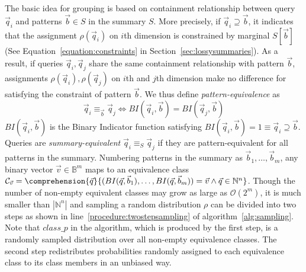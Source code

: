 The basic idea for grouping is based on containment relationship between query $\vec q_i$ and patterns $\vec{b}\in S$ in the summary $S$. 
More precisely, if $\vec{q}_i\supseteq\vec{b}$, it indicates that the assignment $\rho(\vec{q}_i)$ on $i$th dimension is constrained by marginal $S[\vec{b}]$ (See Equation~\ref{equation:constraints} in Section~\ref{sec:lossysummaries}).
As a result, if queries $\vec{q}_i,\vec{q}_j$ share the same containment relationship with pattern $\vec{b}$, assignments $\rho(\vec{q}_i),\rho(\vec{q}_j)$ on $i$th and $j$th dimension make no difference for satisfying the constraint of pattern $\vec{b}$.
We thus define \textit{pattern-equivalence} as $$\vec{q}_i\equiv_{\vec{b}}\vec{q}_j\Leftrightarrow BI(\vec{q}_i,\vec{b})=BI(\vec{q}_j,\vec{b})$$ 
$BI(\vec{q}_i,\vec{b})$ is the Binary Indicator function satisfying $BI(\vec{q}_i,\vec{b})=1\equiv\vec{q}_i\supseteq\vec{b}$. 
Queries are \textit{summary-equivalent} $\vec{q}_i\equiv_S\vec{q}_j$ if they are pattern-equivalent for all patterns in the summary. 
Numbering patterns in the summary as $\vec{b}_1,\ldots,\vec{b}_m$, any binary vector $\vec{v}\in\mathbb{B}^m$ maps to an equivalence class $\mathcal{C}_{\vec{v}}=\comprehension{\vec{q}}{(BI(\vec{q},\vec{b}_1),\ldots,BI(\vec{q},\vec{b}_m))=\vec{v}\wedge\vec{q}\in\mathbb{N}^n}$.
Though the number of non-empty equivalent classes may grow as large as $\mathcal{O}(2^m)$, it is much smaller than $|\mathbb{N}^n|$ and sampling a random distribution $\rho$ can be divided into two steps as shown in line~\ref{procedure:twostepsampling} of algorithm~\ref{alg:sampling}. 
Note that $class\_p$ in the algorithm, which is produced by the first step, is a randomly sampled distribution over all non-empty equivalence classes. The second step redistributes probabilities randomly assigned to each equivalence class to its class members in an unbiased way.

